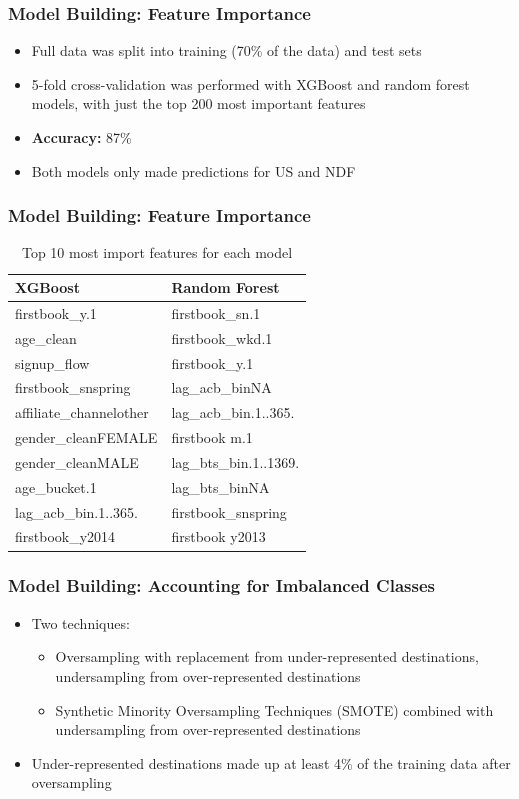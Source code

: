 \documentclass{beamer}
\begin{document}
\begin{frame}
\frametitle{Model Building: Feature Importance}
\begin{itemize}
  \item Full data was split into training (70\% of the data) and test sets
  \item 5-fold cross-validation was performed with XGBoost and random forest models, with just the top 200 most important features
  \item \textbf{Accuracy:} 87\%
  \item Both models only made predictions for US and NDF
\end{itemize}
\end{frame}

\begin{frame}
\frametitle{Model Building: Feature Importance}

\begin{table}[ht]
\centering
\begin{tabular}{| l | l |}
  \hline
  \textbf{XGBoost} & \textbf{Random Forest} \\ 
  \hline
  firstbook\_y.1 & firstbook\_sn.1 \\
  age\_clean & firstbook\_wkd.1 \\
  signup\_flow & firstbook\_y.1 \\
  firstbook\_snspring & lag\_acb\_binNA \\
  affiliate\_channelother & lag\_acb\_bin.1..365. \\
  gender\_cleanFEMALE & firstbook m.1 \\
  gender\_cleanMALE & lag\_bts\_bin.1..1369. \\
  age\_bucket.1 & lag\_bts\_binNA \\
  lag\_acb\_bin.1..365. & firstbook\_snspring \\
  firstbook\_y2014 & firstbook y2013 \\
  \hline
\end{tabular}
\caption{Top 10 most import features for each model}
\end{table}

\end{frame}

\begin{frame}
\frametitle{Model Building: Accounting for Imbalanced Classes}
\begin{itemize}
  \item Two techniques:
  \begin{itemize}
    \item Oversampling with replacement from under-represented destinations, undersampling from over-represented destinations
    \item Synthetic Minority Oversampling Techniques (SMOTE) combined with undersampling from over-represented destinations 
  \end{itemize}
  \item Under-represented destinations made up at least 4\% of the training data after oversampling
\end{itemize}
\end{frame}
\end{document}
